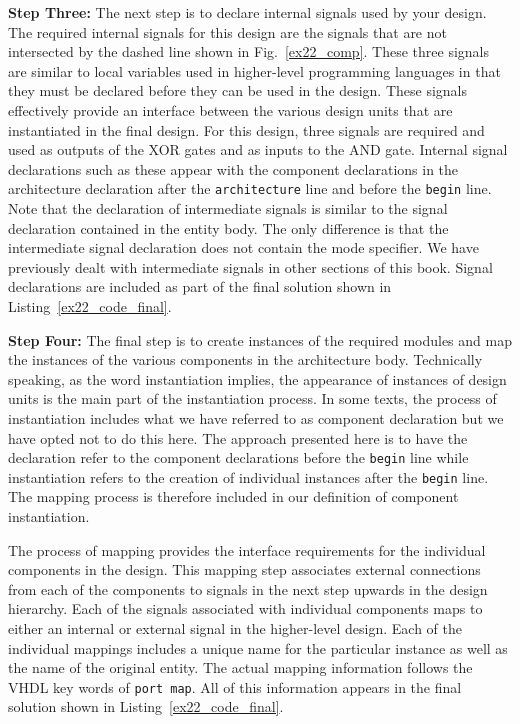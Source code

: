 \noindent
\textbf{Step Three:} The next step is to declare internal signals used by your design. The required internal signals for this design are the signals that are not intersected by the dashed line shown in Fig.~\ref{ex22_comp}. These three signals are similar to local variables used in higher-level programming languages in that they must be declared before they can be used in the design. These signals effectively provide an interface between the various design units that are instantiated in the final design. For this design, three signals are required and used as outputs of the XOR gates and as inputs to the AND gate. Internal signal declarations such as these appear with the component declarations in the architecture declaration after the  \texttt{architecture} line and before the  \texttt{begin} line. Note that the declaration of intermediate signals is similar to the signal declaration contained in the entity body. The only difference is that the intermediate signal declaration does not contain the mode specifier. We have previously dealt with intermediate signals in other sections of this book. Signal declarations are included as part of the final solution shown in Listing~\ref{ex22_code_final}.

\noindent
\textbf{Step Four:} The final step is to create instances of the required modules and map the instances of the various components in the architecture body. Technically speaking, as the word instantiation implies, the appearance of instances of design units is the main part of the instantiation process. In some texts, the process of instantiation includes what we have referred to as component declaration but we have opted not to do this here. The approach presented here is to have the declaration refer to the component declarations before the \texttt{begin} line while instantiation refers to the creation of individual instances after the \texttt{begin} line. The mapping process is therefore included in our definition of component instantiation.

The process of mapping provides the interface requirements for the individual components in the design. This mapping step associates external connections from each of the components to signals in the next step upwards in the design hierarchy. Each of the signals associated with individual components maps to either an internal or external signal in the higher-level design. Each of the individual mappings includes a unique name for the particular instance as well as the name of the original entity. The actual mapping information follows the VHDL key words of \texttt{port map}. All of this information appears in the final solution shown in Listing~\ref{ex22_code_final}.

